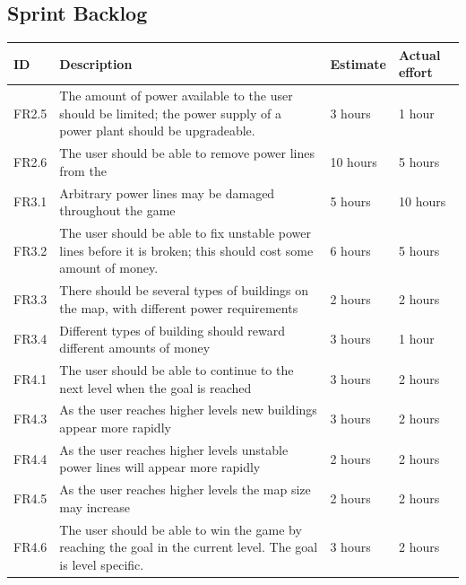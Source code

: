 \clearpage
\subsection{Sprint Backlog}
	\begin{table}[H]
	\begin{tabular}{| p{1cm} | p{7cm} | p{2cm} | p{2cm} |}
		\hline
		\rowcolor{gray}
		ID & Description & Estimate & Actual effort \\ \hline

		FR2.5 & The amount of power available to the user should be limited; 
		the power supply of a power plant should be upgradeable. 
		& 3 hours  & 1 hour \\ \hline

		FR2.6 & The user should be able to remove power lines from the 
		& 10 hours & 5 hours \\ \hline

		FR3.1 & Arbitrary power lines may be damaged throughout the game 
		& 5 hours & 10 hours \\ \hline

		FR3.2 & The user should be able to fix unstable power lines before it is 
		broken; this should cost some amount of money. 
		& 6 hours & 5 hours \\ \hline

		FR3.3 & There should be several types of buildings on the map, with different 
		power requirements 
		& 2 hours & 2 hours \\ \hline

		FR3.4 & Different types of building should reward different amounts of 
		money 
		& 3 hours & 1 hour \\ \hline

		FR4.1 & The user should be able to continue to the next level when the goal is 
		reached 
		& 3 hours & 2 hours \\ \hline

		FR4.3 & As the user reaches higher levels new buildings appear more 
		rapidly 
		& 3 hours & 2 hours \\ \hline

		FR4.4 & As the user reaches higher levels unstable power lines will appear 
		more rapidly 
		& 2 hours & 2 hours \\ \hline

		FR4.5 & As the user reaches higher levels the map size may increase 
		& 2 hours & 2 hours \\ \hline

		FR4.6 & The user should be able to win the game by reaching the goal in 
		the current level. The goal is level specific. 
		& 3 hours & 2 hours \\ \hline


\end{tabular}
\end{table}

